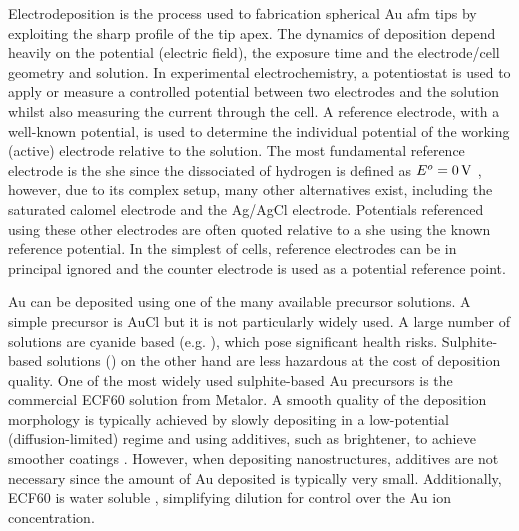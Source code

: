 \documentclass{article}
\begin{document}

Electrodeposition is the process used to fabrication spherical Au \gls{afm} tips by exploiting the sharp profile of the tip apex. The dynamics of deposition depend heavily on the potential (electric field), the exposure time and the electrode/cell geometry and solution. In experimental electrochemistry, a potentiostat is used to apply or measure a controlled potential between two electrodes and the solution whilst also measuring the current through the cell. A reference electrode, with a well-known potential, is used to determine the individual potential of the working (active) electrode relative to the solution. The most fundamental reference electrode is the \gls{she} since the dissociated of hydrogen is defined as $E^o=\SI{0}{V}$ \cite{paunovic2006fundamentals}, however, due to its complex setup, many other alternatives exist, including the saturated calomel electrode and the Ag/AgCl electrode. Potentials referenced using these other electrodes are often quoted relative to a \gls{she} using the known reference potential. In the simplest of cells, reference electrodes can be in principal ignored and the counter electrode is used as a potential reference point.

Au can be deposited using one of the many available precursor solutions. A simple precursor is AuCl but it is not particularly widely used. A large number of solutions are cyanide based (e.g. ), which pose significant health risks. Sulphite-based solutions () on the other hand are less hazardous at the cost of deposition quality. One of the most widely used sulphite-based Au precursors is the commercial ECF60 solution from Metalor. A smooth quality of the deposition morphology is typically achieved by slowly depositing in a low-potential (diffusion-limited) regime and using additives, such as brightener, to achieve smoother coatings \cite{oniciu1991some}. However, when depositing nanostructures, additives are not necessary since the amount of Au deposited is typically very small. Additionally, ECF60 is water soluble \cite{roy2009electrochemical}, simplifying dilution for control over the Au ion concentration.
\end{document}
